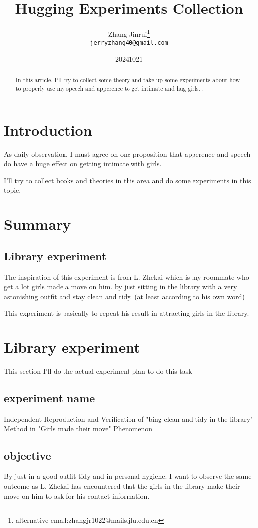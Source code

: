 \documentclass{article}
\title{Hugging Experiments Collection}
\author{Zhang Jinrui\thanks{alternative email:zhangjr1022@mails.jlu.edu.cn} \\ \texttt{jerryzhang40@gmail.com}}
\date{20241021}  %
\begin{document}
\maketitle

\begin{abstract}
    In this article, I'll try to collect some
    theory and take up some experiments about
    how to properly use my speech
    and apperence to get intimate and hug girls.
    \cite[PINN]{raissi2017physics}.
\end{abstract}

\section{Introduction}
As daily observation, I must agree on one
proposition that apperence and speech do
have a huge effect on getting intimate
with girls.

I'll try to collect books and theories in this
area and do some experiments in this topic.

\section{Summary}
\subsection{Library experiment}
The inspiration of this experiment is from
L. Zhekai which is my roommate who get
a lot girls made a move on him.
by just sitting in the
library with a very astonishing outfit and
stay clean and tidy.
(at least according to his own word)

This experiment is basically to repeat his result
in attracting girls in the library.

\section{Library experiment}
This section I'll do the actual experiment plan
to do this task.
\subsection{experiment name}
Independent Reproduction and
Verification of
"bing clean and tidy in the library"
Method in
"Girls made their move" Phenomenon

\subsection{objective}
By just in a good outfit tidy and in
personal hygiene.
I want to observe the same outcome as L. Zhekai
has encountered that the girls in the library
make their move on him to ask for his
contact information.
\end{document}
